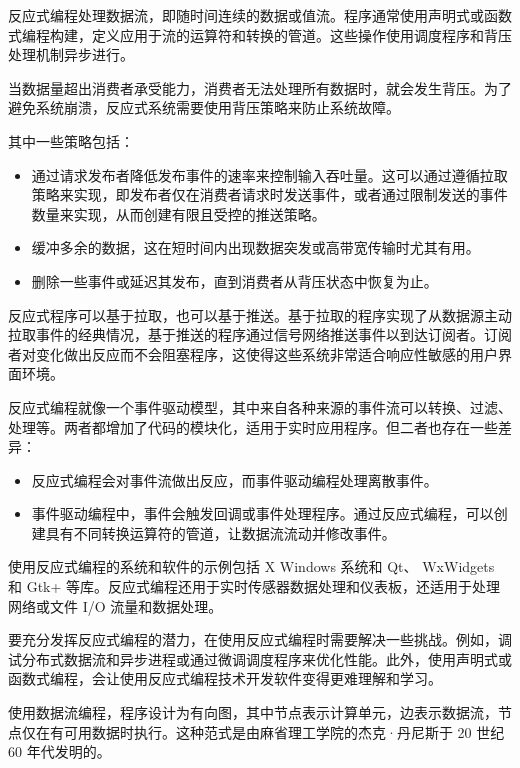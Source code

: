反应式编程处理数据流，即随时间连续的数据或值流。程序通常使用声明式或函数式编程构建，定义应用于流的运算符和转换的管道。这些操作使用调度程序和背压处理机制异步进行。

当数据量超出消费者承受能力，消费者无法处理所有数据时，就会发生背压。为了避免系统崩溃，反应式系统需要使用背压策略来防止系统故障。

其中一些策略包括：

\begin{itemize}
\item
通过请求发布者降低发布事件的速率来控制输入吞吐量。这可以通过遵循拉取策略来实现，即发布者仅在消费者请求时发送事件，或者通过限制发送的事件数量来实现，从而创建有限且受控的推送策略。

\item
缓冲多余的数据，这在短时间内出现数据突发或高带宽传输时尤其有用。

\item
删除一些事件或延迟其发布，直到消费者从背压状态中恢复为止。
\end{itemize}

反应式程序可以基于拉取，也可以基于推送。基于拉取的程序实现了从数据源主动拉取事件的经典情况，基于推送的程序通过信号网络推送事件以到达订阅者。订阅者对变化做出反应而不会阻塞程序，这使得这些系统非常适合响应性敏感的用户界面环境。

反应式编程就像一个事件驱动模型，其中来自各种来源的事件流可以转换、过滤、处理等。两者都增加了代码的模块化，适用于实时应用程序。但二者也存在一些差异：

\begin{itemize}
\item
反应式编程会对事件流做出反应，而事件驱动编程处理离散事件。

\item
事件驱动编程中，事件会触发回调或事件处理程序。通过反应式编程，可以创建具有不同转换运算符的管道，让数据流流动并修改事件。
\end{itemize}

使用反应式编程的系统和软件的示例包括 X Windows 系统和 Qt、 WxWidgets 和 Gtk+ 等库。反应式编程还用于实时传感器数据处理和仪表板，还适用于处理网络或文件 I/O 流量和数据处理。

要充分发挥反应式编程的潜力，在使用反应式编程时需要解决一些挑战。例如，调试分布式数据流和异步进程或通过微调调度程序来优化性能。此外，使用声明式或函数式编程，会让使用反应式编程技术开发软件变得更难理解和学习。


使用数据流编程，程序设计为有向图，其中节点表示计算单元，边表示数据流，节点仅在有可用数据时执行。这种范式是由麻省理工学院的杰克·丹尼斯于 20 世纪 60 年代发明的。

